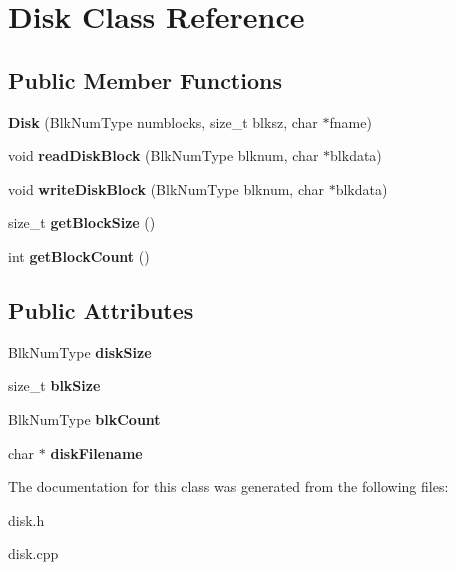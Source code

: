 \hypertarget{classDisk}{}\section{Disk Class Reference}
\label{classDisk}
\subsection*{Public Member Functions}
\begin{DoxyCompactItemize}
\item 
\mbox{\label{classDisk_a373ad35b28630c9b3c9c93c61a76b5bd}} 
{\bfseries Disk} (Blk\+Num\+Type numblocks, size\+\_\+t blksz, char $\ast$fname)
\item 
\mbox{\label{classDisk_a2598cdd9013bdbb1213afa878c567daa}} 
void {\bfseries read\+Disk\+Block} (Blk\+Num\+Type blknum, char $\ast$blkdata)
\item 
\mbox{\label{classDisk_a5d335138f56e6b87c8ebc4b6473183e7}} 
void {\bfseries write\+Disk\+Block} (Blk\+Num\+Type blknum, char $\ast$blkdata)
\item 
\mbox{\label{classDisk_a1c149b57524fe4e7ae7c8643309e0501}} 
size\+\_\+t {\bfseries get\+Block\+Size} ()
\item 
\mbox{\label{classDisk_a3c61119ce5707dd4ab039201590a7c22}} 
int {\bfseries get\+Block\+Count} ()
\end{DoxyCompactItemize}
\subsection*{Public Attributes}
\begin{DoxyCompactItemize}
\item 
\mbox{\label{classDisk_a22a41d8d4018d75d02631242c9cb6033}} 
Blk\+Num\+Type {\bfseries disk\+Size}
\item 
\mbox{\label{classDisk_a24a6b49356fb31072eac0d6bc379bf59}} 
size\+\_\+t {\bfseries blk\+Size}
\item 
\mbox{\label{classDisk_a1267cb656ec862beb0781e45e26e1a4b}} 
Blk\+Num\+Type {\bfseries blk\+Count}
\item 
\mbox{\label{classDisk_a1cdd421815b740f1fbe4587279436b6d}} 
char $\ast$ {\bfseries disk\+Filename}
\end{DoxyCompactItemize}


The documentation for this class was generated from the following files\+:\begin{DoxyCompactItemize}
\item 
disk.\+h\item 
disk.\+cpp\end{DoxyCompactItemize}

